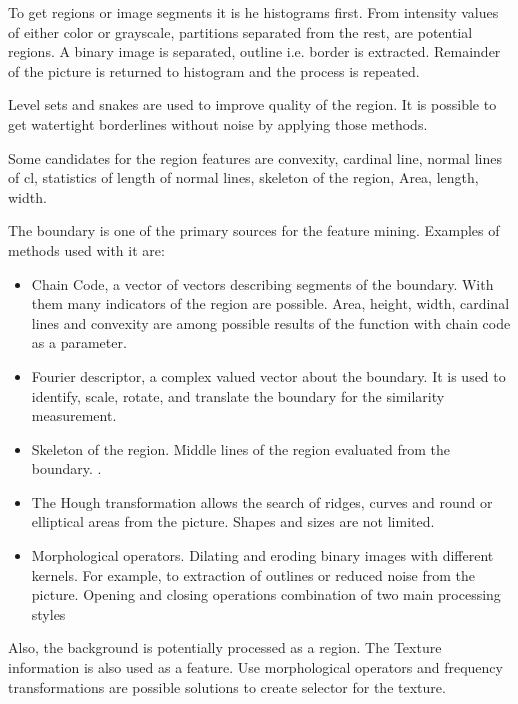 \documentclass[doc/report.tex]{subfiles}
\begin{document}
To get regions or image segments it is he histograms first. From intensity
values of either color or grayscale, partitions separated from the rest, are
potential regions. A binary image is separated, outline i.e. border is
extracted. Remainder of the picture is returned to histogram and the process is
repeated.

Level sets and snakes are used to improve quality of the region. It is possible
to get watertight borderlines without noise by applying those methods.

Some candidates for the region features are convexity, cardinal line, normal
lines of cl, statistics of length of normal lines, skeleton of the region,
Area, length, width.

The boundary is one of the primary sources for the feature mining. Examples of
methods used with it are:

\begin{itemize}
    \item Chain Code, a vector of vectors describing segments of the boundary.
        With them many indicators of the region are possible. Area, height,
        width, cardinal lines and convexity are among possible results of the
        function with chain code as a parameter.
    \item Fourier descriptor, a complex valued vector about the boundary. It is
        used to identify, scale, rotate, and translate the boundary for the
        similarity measurement.
    \item Skeleton of the region. Middle lines of the region evaluated from the
        boundary. .
    \item The Hough transformation allows the search of ridges, curves and
        round or elliptical areas from the picture. Shapes and sizes are not
        limited.
    \item Morphological operators. Dilating and eroding binary images with
        different kernels. For example, to extraction of outlines or reduced
        noise from the picture. Opening and closing operations combination of
        two main processing styles
\end{itemize}

Also, the background is potentially processed as a region. The Texture
information is also used as a feature. Use morphological operators and
frequency transformations are possible solutions to create selector for the
texture.
\end{document}

